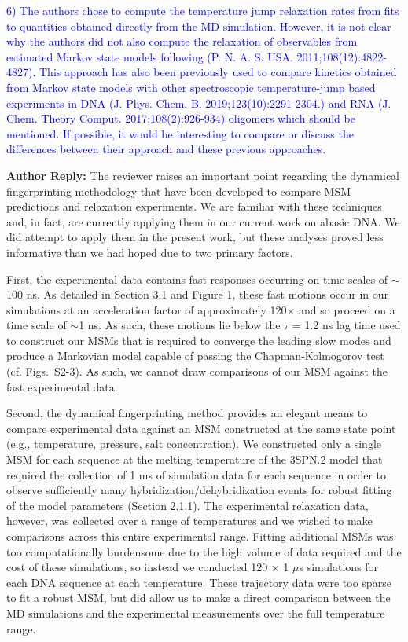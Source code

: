 \documentclass[11pt,a4paper]{letter} %
\begin{document}
\clearpage
\newpage




\textcolor{blue}{6)       The authors chose to compute the temperature jump relaxation rates from fits to quantities obtained directly from the MD simulation. However, it is not clear why the authors did not also compute the relaxation of observables from estimated Markov state models following (P. N. A. S. USA. 2011;108(12):4822-4827). This approach has also been previously used to compare kinetics obtained from Markov state models with other spectroscopic temperature-jump based experiments in DNA (J. Phys. Chem. B. 2019;123(10):2291-2304.) and RNA (J. Chem. Theory Comput. 2017;108(2):926-934) oligomers which should be mentioned. If possible, it would be interesting to compare or discuss the differences between their approach and these previous approaches.}


\textbf{Author Reply:}   The reviewer raises an important point regarding the dynamical fingerprinting methodology that have been developed to compare MSM predictions and relaxation experiments. We are familiar with these techniques and, in fact, are currently applying them in our current work on abasic DNA. We did attempt to apply them in the present work, but these analyses proved less informative than we had hoped due to two primary factors. 

First, the experimental data contains fast responses occurring on time scales of $\sim$100 ns. As detailed in Section 3.1 and Figure 1, these fast motions occur in our simulations at an acceleration factor of approximately 120$\times$ and so proceed on a time scale of $\sim$1 ns. As such, these motions lie below the $\tau$ = 1.2 ns lag time used to construct our MSMs that is required to converge the leading slow modes and produce a Markovian model capable of passing the Chapman-Kolmogorov test (cf. Figs.~S2-3). As such, we cannot draw comparisons of our MSM against the fast experimental data. 

Second, the dynamical fingerprinting method provides an elegant means to compare experimental data against an MSM constructed at the same state point (e.g., temperature, pressure, salt concentration). We constructed only a single MSM for each sequence at the melting temperature of the 3SPN.2 model that required the collection of 1 ms of simulation data for each sequence in order to observe sufficiently many hybridization/dehybridization events for robust fitting of the model parameters (Section 2.1.1). The experimental relaxation data, however, was collected over a range of temperatures and we wished to make comparisons across this entire experimental range. Fitting additional MSMs was too computationally burdensome due to the high volume of data required and the cost of these simulations, so instead we conducted 120 $\times$ 1 $\mu$s simulations for each DNA sequence at each temperature. These trajectory data were too sparse to fit a robust MSM, but did allow us to make a direct comparison between the MD simulations and the experimental measurements over the full temperature range. 
\end{document}
